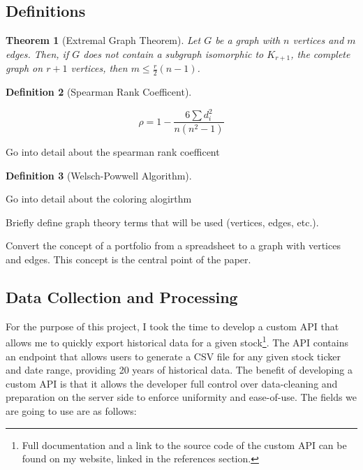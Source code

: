 \documentclass{article}
\newtheorem{theorem}{Theorem}[section]
\newtheorem{definition}[theorem]{Definition}
\begin{document}
\subsection{Definitions}


\begin{theorem}[Extremal Graph Theorem]
    Let $G$ be a graph with $n$ vertices and $m$ edges. Then, if $G$ does not contain a subgraph isomorphic to $K_{r+1}$, the complete graph on $r+1$ vertices, then $m \leq \frac{r}{2}(n-1)$.
\end{theorem}


\begin{definition}[Spearman Rank Coefficent]
\end{definition}

\[
\rho = 1 - \frac{6 \sum d_i^2}{n(n^2-1)}
\]

Go into detail about the spearman rank coefficent


\begin{definition}[Welsch-Powwell Algorithm]
\end{definition}

Go into detail about the coloring alogirthm



Briefly define graph theory terms that will be used (vertices, edges, etc.). 


Convert the concept of a portfolio from a spreadsheet to a graph with vertices and edges. This concept is the central point of the paper.


\subsection{Data Collection and Processing}

For the purpose of this project, I took the time to develop a custom API that allows me to quickly export historical data for a given stock\footnote{Full documentation and a link to the source code of the custom API can be found on my website, linked in the references section.}. The API contains an endpoint that allows users to generate a CSV file for any given stock ticker and date range, providing 20 years of historical data. The benefit of developing a custom API is that it allows the developer full control over data-cleaning and preparation on the server side to enforce uniformity and ease-of-use. The fields we are going to use are as follows:
\end{document}
